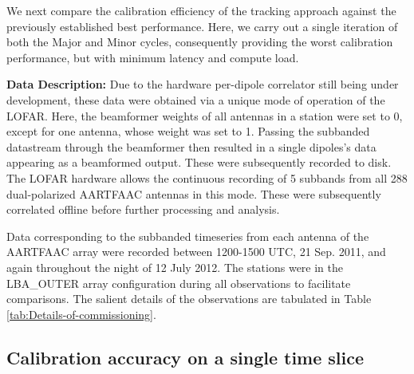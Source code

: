 \documentclass[referee]{aa}
\begin{document}
We next compare the calibration  efficiency of the tracking approach against the
previously established best  performance. Here, we carry out  a single iteration
of both the Major and Minor cycles, consequently providing the worst calibration
performance,   but  with   minimum  latency   and  compute   load.

\begin{table}[h]
\caption{Details of commissioning observations carried out with the AARTFAAC}
\label{tab:Details-of-commissioning}
\end{table}

\textbf{Data Description:} Due to the hardware per-dipole correlator still being
under development,  these data were obtained  via a unique mode  of operation of
the LOFAR. Here, the beamformer weights of all antennas in a station were set to
0, except  for one antenna, whose weight  was set to 1.   Passing the subbanded
datastream  through the  beamformer then  resulted  in a  single dipoles's  data
appearing as a beamformed output. These were subsequently recorded to disk. The
LOFAR  hardware allows  the  continuous recording  of  5 subbands  from all  288
dual-polarized  AARTFAAC  antennas  in   this  mode.   These  were  subsequently
correlated offline before further processing and analysis.

Data corresponding to the subbanded timeseries from each antenna of the AARTFAAC
array were  recorded between 1200-1500 UTC,  21 Sep. 2011,  and again throughout
the  night  of  12  July  2012.   The stations  were  in  the  LBA\_OUTER  array
configuration during  all observations  to facilitate comparisons.   The salient
details     of      the     observations     are      tabulated     in     Table
\ref{tab:Details-of-commissioning}. 




\subsection{\label{sec:calib-accuracy}Calibration accuracy on a single time slice}
\end{document}
